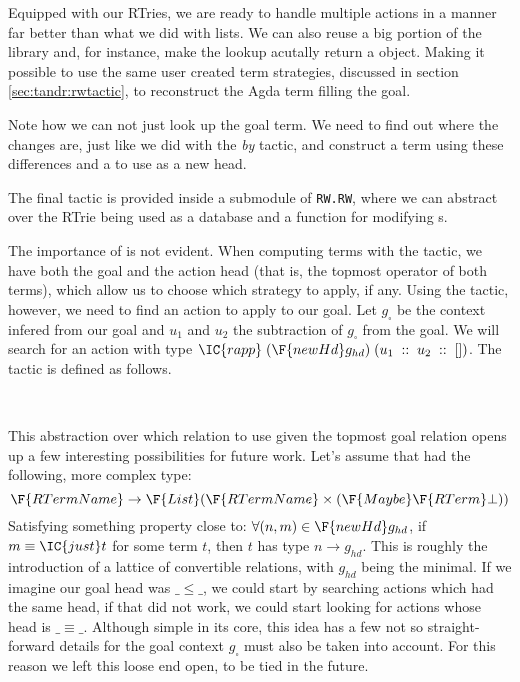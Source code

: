 Equipped with our RTries, we are ready to handle multiple actions in a manner far better
than what we did with lists. We can also reuse a big portion of the library and,
for instance, make the lookup acutally return a  object. Making
it possible to use the same user created term strategies, discussed in section \ref{sec:tandr:rwtactic},
to reconstruct the Agda term filling the goal.


Note how we can not just look up the goal term. We need to find out where the changes are,
just like we did with the \emph{by} tactic, and construct a term using these differences
and a  to use as a new head.

The final tactic is provided inside a submodule of \texttt{\small RW.RW}, where
we can abstract over the RTrie being used as a database and a function for modifying
s.


The importance of  is not evident. When computing terms with the  tactic,
we have both the goal and the action head (that is, the topmost operator of both terms),
which allow us to choose which strategy to apply, if any. Using the  tactic, however,
we need to find an action to apply to our goal. Let $g_\square$ be the context infered from
our goal and $u_1$ and $u_2$ the subtraction of $g_\square$ from the goal. We will search
for an action with type $\IC{rapp}\; (\F{newHd }g_{hd})\;(u_1\;::\;u_2\;::\;[])$. The tactic is defined as follows.

\\

This abstraction over which relation to use given the topmost goal relation opens up a few interesting
possibilities for future work. Let's assume that  had the following, more complex type: 
\[
\F{RTermName} \rightarrow \F{List }(\F{RTermName} \times (\F{Maybe }\F{RTerm }\bot))
\]
Satisfying something property close to: $\forall (n , m) \in \F{newHd }g_{hd}$, if $m \equiv \IC{just }t$
for some term $t$, then $t$ has type $n \rightarrow g_{hd}$. This is roughly the introduction
of a lattice of convertible relations, with $g_{hd}$ being the minimal. If we imagine
our goal head was $\_\leq\_$, we could start by searching actions which had the same head,
if that did not work, we could start looking for actions whose head is $\_\equiv\_$. Although
simple in its core, this idea has a few not so straight-forward details for the goal context $g_\square$
must also be taken into account. For this reason we left this loose end open, to be tied in the future.

